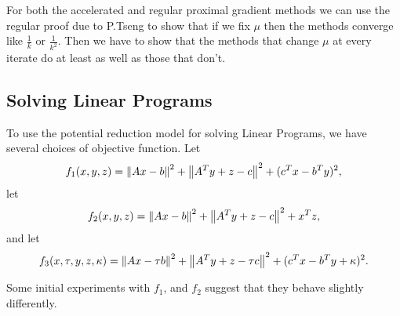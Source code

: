 \documentclass[smallextended]{article}       %
\begin{document}
 For both the accelerated and regular proximal gradient methods we can use the
 regular proof due to P.Tseng to show that if we fix $\mu$ then the methods
 converge like $\frac{1}{k}$ or $\frac{1}{k^2}$.  Then we have to show that the
 methods that change $\mu$ at every iterate do at least as well as those that
 don't.

 \subsection{Solving Linear Programs}
 To use the potential reduction model for solving Linear Programs, 
 we have several choices of objective function.
 Let 
 \[
 f_1(x,y,z) = \left\| Ax-b \right\|^2 + \left\| A^Ty+z-c \right\|^2 + (c^Tx-b^Ty)^2,
 \]
 let 
  \[
 f_2(x,y,z) = \left\| Ax-b \right\|^2 + \left\| A^Ty+z-c \right\|^2 + x^Tz, 
 \]
 and let
  \[
 f_3(x,\tau,y,z,\kappa) = \left\| Ax-\tau b \right\|^2 + \left\| A^Ty+z-\tau c \right\|^2 + (c^Tx-b^Ty+\kappa)^2.
 \]

 Some initial experiments with $f_1$, and $f_2$ suggest that they behave slightly differently.
 
 
\end{document}
